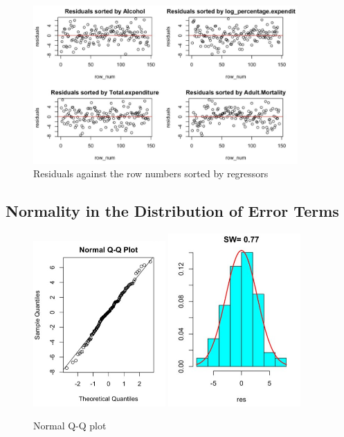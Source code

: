 \begin{figure}
  \centering
  \includegraphics[width = 0.9\textwidth]{figures/independence.PNG}
  \caption{Residuals against the row numbers sorted by regressors}
  \label{fig:independence}
\end{figure}

\subsection{Normality in the Distribution of Error Terms}
\label{sec:normality}

\begin{figure}
  \centering
  \includegraphics[width = 0.45\textwidth]{figures/normality.PNG}
  \includegraphics[width = 0.45\textwidth]{figures/Shapiro.PNG}
  \caption{Normal Q-Q plot}
  \label{fig:normality}
\end{figure} 


